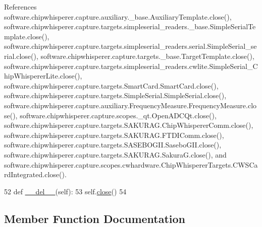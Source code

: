 References software.\+chipwhisperer.\+capture.\+auxiliary.\+\_\+base.\+Auxiliary\+Template.\+close(), software.\+chipwhisperer.\+capture.\+targets.\+simpleserial\+\_\+readers.\+\_\+base.\+Simple\+Serial\+Template.\+close(), software.\+chipwhisperer.\+capture.\+targets.\+simpleserial\+\_\+readers.\+serial.\+Simple\+Serial\+\_\+serial.\+close(), software.\+chipwhisperer.\+capture.\+targets.\+\_\+base.\+Target\+Template.\+close(), software.\+chipwhisperer.\+capture.\+targets.\+simpleserial\+\_\+readers.\+cwlite.\+Simple\+Serial\+\_\+\+Chip\+Whisperer\+Lite.\+close(), software.\+chipwhisperer.\+capture.\+targets.\+Smart\+Card.\+Smart\+Card.\+close(), software.\+chipwhisperer.\+capture.\+targets.\+Simple\+Serial.\+Simple\+Serial.\+close(), software.\+chipwhisperer.\+capture.\+auxiliary.\+Frequency\+Measure.\+Frequency\+Measure.\+close(), software.\+chipwhisperer.\+capture.\+scopes.\+\_\+qt.\+Open\+A\+D\+C\+Qt.\+close(), software.\+chipwhisperer.\+capture.\+targets.\+S\+A\+K\+U\+R\+A\+G.\+Chip\+Whisperer\+Comm.\+close(), software.\+chipwhisperer.\+capture.\+targets.\+S\+A\+K\+U\+R\+A\+G.\+F\+T\+D\+I\+Comm.\+close(), software.\+chipwhisperer.\+capture.\+targets.\+S\+A\+S\+E\+B\+O\+G\+I\+I.\+Sasebo\+G\+I\+I.\+close(), software.\+chipwhisperer.\+capture.\+targets.\+S\+A\+K\+U\+R\+A\+G.\+Sakura\+G.\+close(), and software.\+chipwhisperer.\+capture.\+scopes.\+cwhardware.\+Chip\+Whisperer\+Targets.\+C\+W\+S\+Card\+Integrated.\+close().


\begin{DoxyCode}
52     \textcolor{keyword}{def }\hyperlink{classsoftware_1_1chipwhisperer_1_1capture_1_1targets_1_1SmartCard_1_1SmartCard_aa202441bf0ac4c434c012451e907f115}{\_\_del\_\_}(self):
53         self.\hyperlink{classsoftware_1_1chipwhisperer_1_1capture_1_1targets_1_1SmartCard_1_1SmartCard_a8df98929dac376c0d790dda1521e3f7c}{close}()
54 
\end{DoxyCode}


\subsection{Member Function Documentation}
\hypertarget{classsoftware_1_1chipwhisperer_1_1capture_1_1targets_1_1SmartCard_1_1SmartCard_a8db2cd6371d683a6905e7ec86ee532a0}{}
